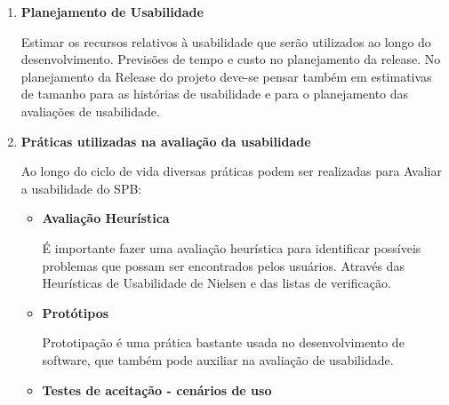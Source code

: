 \begin{enumerate}
	
		
	\item \textbf{Planejamento de Usabilidade}

	Estimar os recursos relativos à usabilidade que serão utilizados ao longo do desenvolvimento. Previsões de tempo e custo no planejamento da release. No planejamento da Release do projeto deve-se pensar também em estimativas de tamanho para as histórias de usabilidade e para o planejamento das avaliações de usabilidade.


	\item \textbf{Práticas utilizadas na avaliação da usabilidade}

	Ao longo do ciclo de vida diversas práticas podem ser realizadas para Avaliar a usabilidade do SPB:
	
		
	\begin{itemize}
		\item \textbf{Avaliação Heurística}
		
		É importante fazer uma avaliação heurística para identificar possíveis problemas que possam ser encontrados pelos usuários. Através das Heurísticas de Usabilidade de Nielsen e das listas de verificação. 
		
	
		\item \textbf{Protótipos}

		Prototipação é uma prática bastante usada no desenvolvimento de software, que também pode auxiliar na avaliação de usabilidade.

		\item \textbf{Testes de aceitação - cenários de uso}


\end{itemize}
\end{enumerate}
